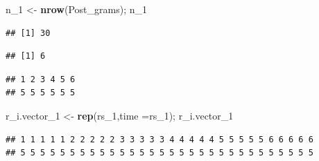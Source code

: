 \documentclass[12pt,]{article}
\newenvironment{Shaded}{\begin{snugshade}}{\end{snugshade}}
\newcommand{\KeywordTok}[1]{\textcolor[rgb]{0.13,0.29,0.53}{\textbf{#1}}}
\newcommand{\DataTypeTok}[1]{\textcolor[rgb]{0.13,0.29,0.53}{#1}}
\newcommand{\DecValTok}[1]{\textcolor[rgb]{0.00,0.00,0.81}{#1}}
\newcommand{\StringTok}[1]{\textcolor[rgb]{0.31,0.60,0.02}{#1}}
\newcommand{\OperatorTok}[1]{\textcolor[rgb]{0.81,0.36,0.00}{\textbf{#1}}}
\newcommand{\NormalTok}[1]{#1}
\begin{document}
\begin{Shaded}
\begin{Highlighting}[]
\NormalTok{n_}\DecValTok{1}\NormalTok{ <-}\StringTok{ }\KeywordTok{nrow}\NormalTok{(Post_grams); n_}\DecValTok{1}
\end{Highlighting}
\end{Shaded}

\begin{verbatim}
## [1] 30
\end{verbatim}

\begin{Shaded}
\end{Shaded}

\begin{verbatim}
## [1] 6
\end{verbatim}

\begin{Shaded}
\end{Shaded}

\begin{verbatim}
## 1 2 3 4 5 6 
## 5 5 5 5 5 5
\end{verbatim}

\begin{Shaded}
\begin{Highlighting}[]
\NormalTok{r_i.vector_}\DecValTok{1}\NormalTok{ <-}\StringTok{ }\KeywordTok{rep}\NormalTok{(rs_}\DecValTok{1}\NormalTok{,}\DataTypeTok{time =}\NormalTok{rs_}\DecValTok{1}\NormalTok{); r_i.vector_}\DecValTok{1}
\end{Highlighting}
\end{Shaded}

\begin{verbatim}
## 1 1 1 1 1 2 2 2 2 2 3 3 3 3 3 4 4 4 4 4 5 5 5 5 5 6 6 6 6 6 
## 5 5 5 5 5 5 5 5 5 5 5 5 5 5 5 5 5 5 5 5 5 5 5 5 5 5 5 5 5 5
\end{verbatim}
\end{document}
